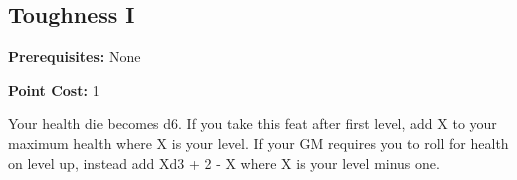 \subsection{Toughness I}\label{feat:toughness1}

\noindent
\textbf{Prerequisites:} None

\noindent
\textbf{Point Cost:} 1 

Your health die becomes d6. If you take this feat after first level, add X to
your maximum health where X is your level. If your GM requires you to roll for
health on level up, instead add Xd3 + 2 - X where X is your level minus one.

